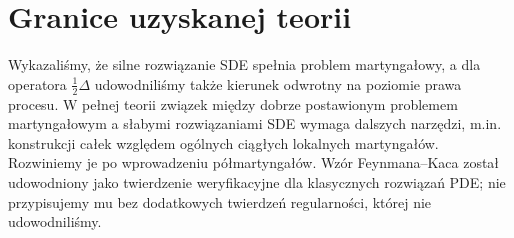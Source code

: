 \section{Granice uzyskanej teorii}
Wykazaliśmy, że silne rozwiązanie SDE spełnia problem martyngałowy,
a dla operatora $\frac12\Delta$ udowodniliśmy także kierunek odwrotny
na poziomie prawa procesu. W pełnej teorii związek między dobrze
postawionym problemem martyngałowym a słabymi rozwiązaniami SDE
wymaga dalszych narzędzi, m.in. konstrukcji całek względem ogólnych
ciągłych lokalnych martyngałów. Rozwiniemy je po wprowadzeniu
półmartyngałów. Wzór Feynmana--Kaca został udowodniony jako
twierdzenie weryfikacyjne dla klasycznych rozwiązań PDE;
nie przypisujemy mu bez dodatkowych twierdzeń regularności,
której nie udowodniliśmy.


